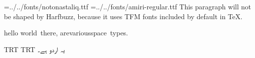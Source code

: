 
\pagewidth=210mm
\pageheight=297mm
\hsize=210mm
\hsize=190mm
\hoffset=10mm
\nopagenumbers
\parindent=0mm
\font\noto={../../fonts/notonastaliq.ttf}
\font\amiri={../../fonts/amiri-regular.ttf}
This paragraph will not be shaped by Harfbuzz, because it uses TFM fonts included by default in \TeX.

\amiri
hello world~there, are\quad various\qquad space\ types.

\textdir TRT
\pardir TRT
\noto
یہ اردو ہے۔
\bye
